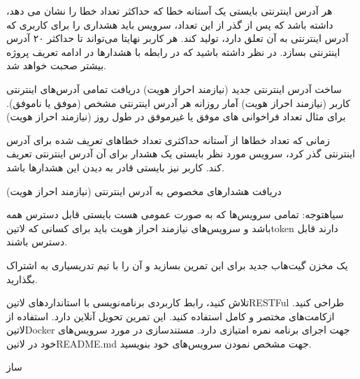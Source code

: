 \documentclass{../assignment}
\begin{document}

هر آدرس اینترنتی بایستی یک آستانه خطا که حداکثر تعداد خطا را نشان می دهد، داشته باشد که پس از گذر از این تعداد، سرویس باید هشداری را برای کاربری که آدرس اینترنتی به آن تعلق دارد، تولید کند.
هر کاربر نهایتا می‌تواند تا حداکثر ۲۰ آدرس اینترنتی بسازد.
در نظر داشته باشید که در رابطه با هشدارها در ادامه تعریف پروژه بیشتر صحبت خواهد شد.


 ساخت آدرس اینترنتی جدید (نیازمند احراز هویت)
 دریافت تمامی آدرس‌های اینترنتی کاربر (نیازمند احراز هویت)
 آمار روزانه هر آدرس اینترنتی مشخص (موفق یا ناموفق). برای مثال تعداد فراخوانی ‌های موفق یا غیرموفق در طول روز (نیازمند احراز هویت)


زمانی که تعداد خطاها از آستانه حداکثری تعداد خطاهای تعریف شده برای آدرس‌ اینترنتی گذر کرد، سرویس مورد نظر بایستی یک هشدار برای آن آدرس اینترنتی تعریف کند.
کاربر نیز بایستی قادر به دیدن این هشدارها باشد.


 دریافت هشدارهای مخصوص به آدرس اینترنتی (نیازمند احراز هویت)

‌سیاه{توجه: تمامی سرویس‌ها که به صورت عمومی هست بایستی قابل دسترس همه باشد و سرویس‌های نیازمند احراز هویت باید برای کسانی که ‌لاتین{token} دارند قابل دسترس باشند.}



یک مخزن گیت‌هاب جدید برای این تمرین بسازید و آن را با تیم تدریسیاری به اشتراک بگذارید.

 تلاش کنید، رابط کاربردی برنامه‌نویسی با استانداردهای ‌لاتین{RESTFul} طراحی کنید.
 ازکامت‌های مختصر و کامل استفاده کنید.
 این تمرین تحویل آنلاین دارد.
 استفاده از ‌لاتین{Docker} جهت اجرای برنامه نمره امتیازی دارد.
 مستندسازی در مورد سرویس‌های خود در ‌لاتین{README.md} جهت مشخص نمودن سرویس‌های خود بنویسید.


‌ساز
\end{document}
